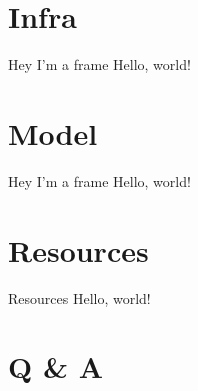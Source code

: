 \documentclass{beamer}
\begin{document}
\section{Infra}
\label{sec:infra}
\begin{frame}{Hey I'm a frame}
  Hello, world!
\end{frame}

\section{Model}
\label{sec:model}
\begin{frame}{Hey I'm a frame}
  Hello, world!
\end{frame}

\section{Resources}
\label{sec:resources}
\begin{frame}{Resources}
  Hello, world!
\end{frame}

\section{Q \& A}
\label{sec:qa}
\end{document}
